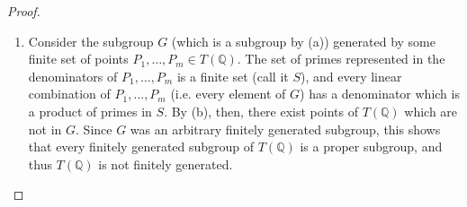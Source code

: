 \documentclass[12pt]{article}
\theoremstyle{definition}
\begin{document}
\begin{proof}
\begin{enumerate}[label=(\alph*)]
      First, we find the $y$-intercept of this line, which will be \begin{equation*}
        B = \frac{b}{p_1^{b_1}\cdots p_k^{b_k}} - \frac{a\alpha}{\beta p_1^{a_1} \cdots p_k^{a_k}} = \frac{b\beta p_1^{a_1} \cdots p_k^{a_k} - a\alpha p_1^{b_1} \cdots p_k^{b_k}}{\beta p_1^{a_1 + b_1} \cdots p_k^{a_k + b_k}}.
      \end{equation*}
      Thus \begin{align*}
        Y & = \frac{\alpha X}{\beta} + \frac{b\beta p_1^{a_1} \cdots p_k^{a_k} - a\alpha p_1^{b_1} \cdots p_k^{b_k}}{\beta p_1^{a_1 + b_1} \cdots p_k^{a_k + b_k}} \\
        & = \frac{\alpha X p_1^{a_1 + b_1} \cdots p_k^{a_k + b_k} + b\beta p_1^{a_1} \cdots p_k^{a_k} - a\alpha p_1^{b_1} \cdots p_k^{b_k}}{\beta p_1^{a_1 + b_1} \cdots p_k^{a_k + b_k}}.
      \end{align*}
      Certainly, we can choose $\beta$ such that it contains no factors in $S$, and then $Y$ will be rational with denominator not consisting of prime factors only in $S$, as desired.
		\item Consider the subgroup $G$ (which is a subgroup by (a)) generated by some finite set of points $P_1, \dots, P_m \in T(\mathbb{Q})$.
		      The set of primes represented in the denominators of $P_1, \dots, P_m$ is a finite set (call it $S$), and every linear combination of $P_1, \dots, P_m$ (i.e. every element of $G$) has a denominator which is a product of primes in $S$.
		      By (b), then, there exist points of $T(\mathbb{Q})$ which are not in $G$.
		      Since $G$ was an arbitrary finitely generated subgroup, this shows that every finitely generated subgroup of $T(\mathbb{Q})$ is a proper subgroup, and thus $T(\mathbb{Q})$ is not finitely generated.
	\end{enumerate}
\end{proof}
\end{document}
